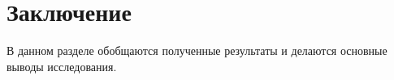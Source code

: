 \section{Заключение}
\label{sec:Conclusion}

В данном разделе обобщаются полученные результаты и делаются основные выводы исследования.